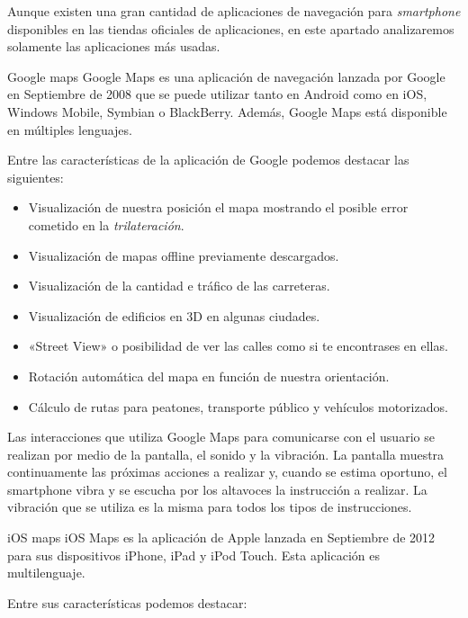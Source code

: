 Aunque existen una gran cantidad de aplicaciones de navegación para \emph{smartphone} disponibles en
las tiendas oficiales de aplicaciones, en este apartado analizaremos solamente las aplicaciones más
usadas.

\begin{definitionlist}
  \item[Google maps] Google Maps es una aplicación de navegación lanzada por Google en Septiembre de
    2008 que se puede utilizar tanto en Android como en iOS, Windows Mobile, Symbian o
    BlackBerry. Además, Google Maps está disponible en múltiples lenguajes.

    Entre las características de la aplicación de Google podemos destacar las siguientes:

    \begin{itemize}
      \item Visualización de nuestra posición el mapa mostrando el posible error cometido en la
        \emph{trilateración}.
      \item Visualización de mapas offline previamente descargados.
      \item Visualización de la cantidad e tráfico de las carreteras.
      \item Visualización de edificios en 3D en algunas ciudades.
      \item «Street View» o posibilidad de ver las calles como si te encontrases en ellas.
      \item Rotación automática del mapa en función de nuestra orientación.
      \item Cálculo de rutas para peatones, transporte público y vehículos motorizados.
    \end{itemize}

    Las interacciones que utiliza Google Maps para comunicarse con el usuario se realizan por medio
    de la pantalla, el sonido y la vibración. La pantalla muestra continuamente las próximas
    acciones a realizar y, cuando se estima oportuno, el smartphone vibra y se escucha por los
    altavoces la instrucción a realizar. La vibración que se utiliza es la misma para todos los
    tipos de instrucciones.

  \item[iOS maps] iOS Maps es la aplicación de Apple lanzada en Septiembre de 2012 para sus
    dispositivos iPhone, iPad y iPod Touch. Esta aplicación es multilenguaje.

    Entre sus características podemos destacar:


\end{definitionlist}
